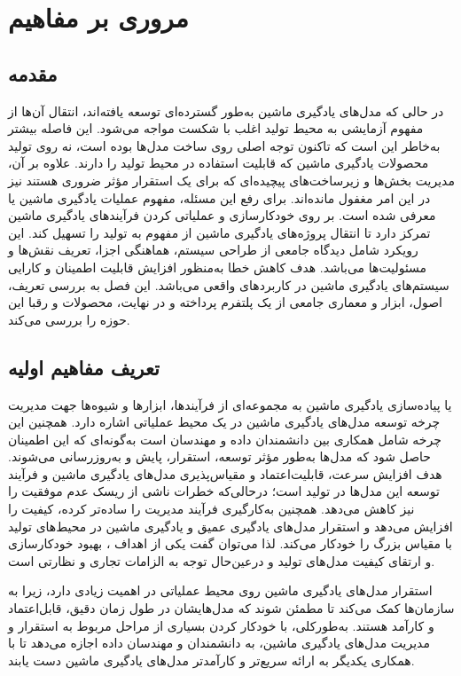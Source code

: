 \chapter{مروری بر مفاهیم }\label{ch:HVS}
 
\section{مقدمه}
 
در حالی که مدل‌های یادگیری ماشین به‌طور گسترده‌ای توسعه یافته‌اند، انتقال آن‌ها از مفهوم آزمایشی به محیط تولید اغلب با شکست مواجه می‌شود. این فاصله بیشتر به‌خاطر این است که تاکنون توجه اصلی روی ساخت مدل‌ها بوده است، نه روی تولید محصولات یادگیری ماشین که قابلیت استفاده در محیط تولید را دارند. علاوه بر آن، مدیریت بخش‌ها و زیرساخت‌های پیچیده‌ای که برای یک استقرار مؤثر ضروری هستند نیز در این امر مغفول مانده‌اند. برای رفع این مسئله، مفهوم عملیات یادگیری ماشین یا  معرفی شده است.  بر روی خودکارسازی و عملیاتی کردن فرآیندهای یادگیری ماشین تمرکز دارد تا انتقال پروژه‌های یادگیری ماشین از مفهوم به تولید را تسهیل کند. این رویکرد شامل دیدگاه جامعی از طراحی سیستم، هماهنگی اجزا، تعریف نقش‌ها و مسئولیت‌ها می‌باشد. هدف کاهش خطا به‌منظور افزایش قابلیت اطمینان و کارایی سیستم‌های یادگیری ماشین در کاربردهای واقعی می‌باشد. این فصل به بررسی تعریف، اصول، ابزار و معماری جامعی از یک پلتفرم  پرداخته و در نهایت، محصولات و رقبا این حوزه را بررسی می‌کند.


\section{تعریف مفاهیم اولیه}
 
 یا پیاده‌سازی یادگیری ماشین به مجموعه‌ای از فرآیندها، ابزارها و شیوه‌ها جهت مدیریت چرخه توسعه مدل‌های یادگیری ماشین در یک محیط عملیاتی اشاره دارد. همچنین این چرخه شامل همکاری بین دانشمندان داده و مهندسان  است به‌گونه‌ای که این اطمینان حاصل شود که مدل‌ها به‌طور مؤثر توسعه، استقرار، پایش و به‌روزرسانی می‌شوند. هدف  افزایش سرعت، قابلیت‌اعتماد و مقیاس‌پذیری مدل‌های یادگیری ماشین و فرآیند توسعه این مدل‌ها در تولید است؛ درحالی‌که خطرات ناشی از ریسک عدم موفقیت را نیز کاهش می‌دهد. همچنین به‌کارگیری  فرآیند مدیریت را ساده‌تر کرده، کیفیت را افزایش می‌دهد و استقرار مدل‌های یادگیری عمیق و یادگیری ماشین در محیط‌های تولید با مقیاس بزرگ را خودکار می‌کند. لذا می‌توان گفت یکی از اهداف ، بهبود خودکارسازی و ارتقای کیفیت مدل‌های تولید و درعین‌حال توجه به الزامات تجاری و نظارتی است.
 
 استقرار مدل‌های یادگیری ماشین روی محیط عملیاتی در  اهمیت زیادی دارد، زیرا به سازمان‌ها کمک می‌کند تا مطمئن شوند که مدل‌هایشان در طول زمان دقیق، قابل‌اعتماد و کارآمد هستند. به‌طورکلی،  با خودکار کردن بسیاری از مراحل مربوط به استقرار و مدیریت مدل‌های یادگیری ماشین، به دانشمندان و مهندسان داده اجازه می‌دهد تا با همکاری یکدیگر به ارائه سریع‌تر و کارآمدتر مدل‌های یادگیری ماشین دست یابند.
 
